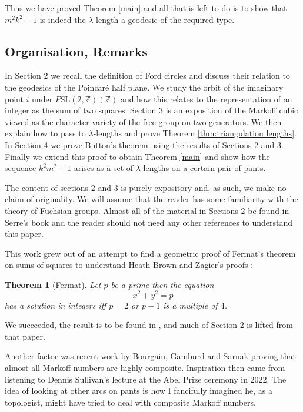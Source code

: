 \documentclass[12pt,a4paper]{amsart}
\newtheorem{thm}{Theorem}[section]
\def\ZZ{\mathbb{Z}}
\def\sl2{\mathrm{SL}(2, \ZZ)}
\begin{document}
Thus we have proved Theorem \ref{main} and all that is left to do is to show
that $m^2k^2 + 1$ is indeed the $\lambda$-length a geodesic of the required type.


\subsection{Organisation, Remarks}

In Section 2 we recall the definition of Ford circles and discuss their
relation to the geodesics of the Poincaré half plane. We study the orbit of the
imaginary point $i$ under $P\sl2(\ZZ)$ and how this relates to the
representation of an integer as the sum of two squares. Section 3  is an
exposition of the Markoff cubic viewed as the character variety of the free
group on two generators. We then explain how to pass to $\lambda$-lengths and
prove Theorem \ref{thm:triangulation lengths}. In Section 4 we prove Button's
theorem using the results of Sections 2 and  3.  Finally we extend this proof
to obtain Theorem \ref{main} and show how the sequence $k^2m^2 + 1$ arises as a
set of $\lambda$-lengths on a certain pair of pants.


The content of sections 2 and 3 is purely expository and, as such, we make no
claim of originality. We will assume that the reader has some familiarity with
the theory of Fuchsian groups. Almost all  of the material in Sections 2 be
found in Serre's book \cite{serre} and the reader should not need any other
references to understand this paper. 

This work grew out of an attempt to find a geometric proof of Fermat's theorem
on sums of squares to understand Heath-Brown and Zagier's proofs \cite{zagier}:

 \begin{thm}[Fermat]
 Let $p$ be a prime then the equation
 $$x^2 + y^2 = p $$
 has a solution in integers  iff  $p =2$ or $p-1$ is a multiple of $4$.
 \end{thm}

 \noindent We succeeded, the result is to be found in \cite{squares}, and much
 of Section 2 is lifted from that paper.

Another factor was recent work by Bourgain, Gamburd and Sarnak proving that
almost all Markoff numbers are highly composite. Inspiration then  came from
listening to Dennis Sullivan's lecture at the Abel Prize ceremony in 2022. The
idea of looking at other arcs on pants is how I fancifully imagined he, as a
topologist, might have tried to deal with composite Markoff numbers.
\end{document}
